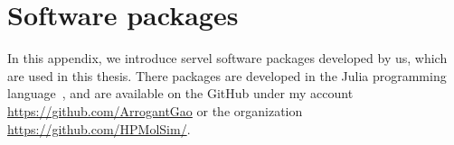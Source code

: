 \section{Software packages}

In this appendix, we introduce servel software packages developed by us, which are used in this thesis.
There packages are developed in the Julia programming language~\cite{Bezanson_Julia_A_fresh_2017}, and are available on the GitHub under my account \url{https://github.com/ArrogantGao} or the organization \url{https://github.com/HPMolSim/}.